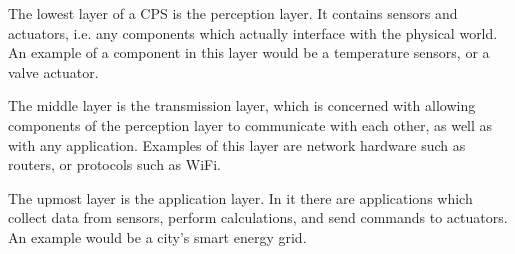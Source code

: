 \documentclass[a4paper]{scrreprt}
\begin{document}
The lowest layer of a CPS is the perception layer. It contains sensors and
actuators, i.e. any components which actually interface with the physical world.
An example of a component in this layer would be a temperature sensors, or a
valve actuator.

The middle layer is the transmission layer, which is concerned with allowing
components of the perception layer to communicate with each other, as well as
with any application. Examples of this layer are network hardware such as
routers, or protocols such as WiFi.

The upmost layer is the application layer. In it there are applications which
collect data from sensors, perform calculations, and send commands to
actuators.  An example would be a city's smart energy grid.
\end{document}
